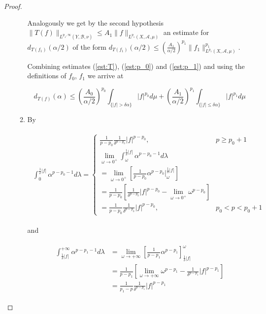 \begin{proof}
\begin{enumerate}[label = \textbf{(\roman*.)}]
\begin{enumerate}[label = \textbf{\alph*.}]
Analogously we get by the second hypothesis $\|T(f)\|_{L^{p_1,\infty}(Y,\mathcal{B},\nu)} \leqslant A_1 \|f\|_{L^{p_1}(X,\mathcal{A},\mu)}$ an estimate for $d_{T(f_1)}(\alpha/2)$ of the form $d_{T(f_1)}(\alpha/2) \leqslant \left(\frac{A_1}{\alpha/2}\right)^{p_1} \|f_1\|^{p_1}_{L^{p_1}(X,\mathcal{A},\mu)}\label{est:p_1}$.

Combining estimates (\ref{est:T}), (\ref{est:p_0}) and (\ref{est:p_1}) and using the definitions of $f_0$, $f_1$ we arrive at

\begin{equation}
	d_{T(f)}(\alpha) \leqslant \left(\frac{A_0}{\alpha/2}\right)^{p_0} \int_{\{\vert f \vert > \delta \alpha\}} \vert f \vert^{p_0}d\mu + \left(\frac{A_1}{\alpha/2}\right)^{p_1} \int_{\{\vert f \vert \leqslant \delta \alpha\}} \vert f \vert^{p_1}d\mu
\label{est:dist}
\end{equation}

	\item By

		\begin{gather}
			\begin{aligned}
				\int_0^{\frac{1}{\delta}\vert f\vert}\alpha^{p-p_0-1} d\lambda = 
				\begin{cases}
					\frac{1}{p-p_0}\frac{1}{\delta^{p-p_0}}\vert f \vert^{p - p_0}, & p \geqslant p_0 + 1\\
					\lim\limits_{\omega \rightarrow 0^+} \int_\omega^{\frac{1}{\delta}\vert f\vert}\alpha^{p-p_0-1} d\lambda\\
					= \lim\limits_{\omega \rightarrow 0^+}\left[\frac{1}{p-p_0}\alpha^{p - p_0}\big\vert_\omega^{\frac{1}{\delta}\vert f\vert}\right]\\
					= \frac{1}{p-p_0}\left[\frac{1}{\delta^{p-p_0}}\vert f \vert^{p - p_0} - \lim\limits_{\omega \rightarrow 0^+} \omega^{p-p_0}\right]\\
					= \frac{1}{p-p_0}\frac{1}{\delta^{p-p_0}} \vert f\vert^{p - p_0}, & p_0 < p < p_0 + 1
				\end{cases}
			\end{aligned}
		\end{gather}

		and

		\begin{gather}
			\begin{aligned}
				\int_{\frac{1}{\delta}\vert f\vert}^{+\infty}\alpha^{p-p_1-1} d\lambda &= \lim\limits_{\omega \rightarrow +\infty} \left[ \frac{1}{p - p_1} \alpha^{p - p_1}\right]^\omega_{\frac{1}{\delta}\vert f\vert}\\
				&= \frac{1}{p - p_1} \left[  \lim\limits_{\omega \rightarrow + \infty} \omega^{p - p_1} - \frac{1}{\delta^{p - p_1}} \vert f\vert^{p - p_1}\right]\\
				&= \frac{1}{p_1 - p}\frac{1}{\delta^{p-p_1}} \vert f \vert^{p - p_1}
			\end{aligned}
		\end{gather}


\end{enumerate}
\end{enumerate}
\end{proof}
